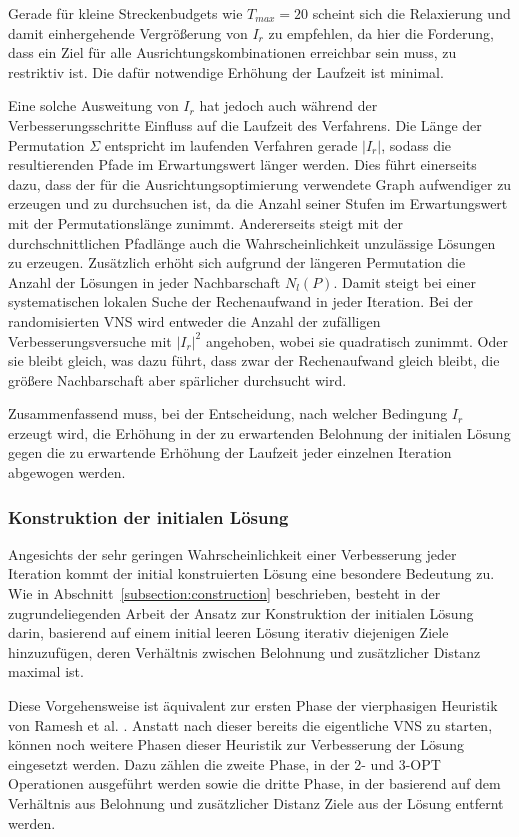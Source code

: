 \documentclass[12pt,a4paper,twoside]{article}
\theoremstyle{definition}
\numberwithin{equation}{section}
\begin{document}
Gerade für kleine Streckenbudgets wie $T_{max} = 20$ scheint sich die Relaxierung und damit einhergehende Vergrößerung von $I_r$ zu empfehlen, da hier die Forderung, dass ein Ziel für alle Ausrichtungskombinationen erreichbar sein muss, zu restriktiv ist. Die dafür notwendige Erhöhung der Laufzeit ist minimal.

Eine solche Ausweitung von $I_r$ hat jedoch auch während der Verbesserungsschritte Einfluss auf die Laufzeit des Verfahrens. Die Länge der Permutation $\Sigma$ entspricht im laufenden Verfahren gerade $|I_r|$, sodass die resultierenden Pfade im Erwartungswert länger werden. Dies führt einerseits dazu, dass der für die Ausrichtungsoptimierung verwendete Graph aufwendiger zu erzeugen und zu durchsuchen ist, da die Anzahl seiner Stufen im Erwartungswert mit der Permutationslänge zunimmt. Andererseits steigt mit der durchschnittlichen Pfadlänge auch die Wahrscheinlichkeit unzulässige Lösungen zu erzeugen. Zusätzlich erhöht sich aufgrund der längeren Permutation die Anzahl der Lösungen in jeder Nachbarschaft $N_l(P)$. Damit steigt bei einer systematischen lokalen Suche der Rechenaufwand in jeder Iteration. Bei der randomisierten VNS wird entweder die Anzahl der zufälligen Verbesserungsversuche mit $|I_r|^2$ angehoben, wobei sie quadratisch zunimmt. Oder sie bleibt gleich, was dazu führt, dass zwar der Rechenaufwand gleich bleibt, die größere Nachbarschaft aber spärlicher durchsucht wird.

Zusammenfassend muss, bei der Entscheidung, nach welcher Bedingung $I_r$ erzeugt wird, die Erhöhung in der zu erwartenden Belohnung der initialen Lösung gegen die zu erwartende Erhöhung der Laufzeit jeder einzelnen Iteration abgewogen werden.

\subsubsection{Konstruktion der initialen Lösung}\label{subsubsec:constructionImprove}
Angesichts der sehr geringen Wahrscheinlichkeit einer Verbesserung jeder Iteration kommt der initial konstruierten Lösung eine besondere Bedeutung zu. Wie in Abschnitt~\ref{subsection:construction} beschrieben, besteht in der zugrundeliegenden Arbeit der Ansatz zur Konstruktion der initialen Lösung darin, basierend auf einem initial leeren Lösung iterativ diejenigen Ziele hinzuzufügen, deren Verhältnis zwischen Belohnung und zusätzlicher Distanz maximal ist. 

Diese Vorgehensweise ist äquivalent zur ersten Phase der vierphasigen Heuristik von Ramesh et al. \cite{Ramesh.1991}.
Anstatt nach dieser bereits die eigentliche VNS zu starten, können noch weitere Phasen dieser Heuristik zur Verbesserung der Lösung eingesetzt werden. Dazu zählen die zweite Phase, in der 2- und 3-OPT Operationen ausgeführt werden sowie die dritte Phase, in der basierend auf dem Verhältnis aus Belohnung und zusätzlicher Distanz Ziele aus der Lösung entfernt werden.
\end{document}

